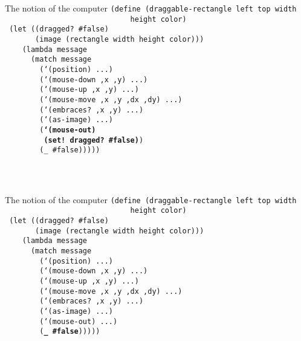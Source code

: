 \begin{frame}{The notion of the computer}
  \small
  \texttt{(define (draggable-rectangle left top width \\
    \ \ \ \ \ \ \ \ \ \ \ \ \ \ \ \ \ \ \ \ \ \ \ \ \ \ \ \ \ height color)\\
    \ (let ((dragged? \#false)\\
  \ \ \ \ \ \ \ (image (rectangle width height color)))\\
  \ \ \ \ (lambda message\\
  \ \ \ \ \ \ (match message\\
  \ \ \ \ \ \ \ \ (`(position) ...)\\
  \ \ \ \ \ \ \ \ (`(mouse-down ,x ,y) ...)\\
  \ \ \ \ \ \ \ \ (`(mouse-up ,x ,y) ...)\\
  \ \ \ \ \ \ \ \ (`(mouse-move ,x ,y ,dx ,dy) ...)\\
  \ \ \ \ \ \ \ \ (`(embraces? ,x ,y) ...)\\
  \ \ \ \ \ \ \ \ (`(as-image) ...)\\
  \ \ \ \ \ \ \ \ (\textbf{`(mouse-out) \\
  \ \ \ \ \ \ \ \ \ (set! dragged? \#false)})\\
  \ \ \ \ \ \ \ \ (\_ \#false)))))\\
  \ \\
  \ \\
  \ 
}
\end{frame}


\begin{frame}{The notion of the computer}
  \small
  \texttt{(define (draggable-rectangle left top width \\
    \ \ \ \ \ \ \ \ \ \ \ \ \ \ \ \ \ \ \ \ \ \ \ \ \ \ \ \ \ height color)\\
    \ (let ((dragged? \#false)\\
  \ \ \ \ \ \ \ (image (rectangle width height color)))\\
  \ \ \ \ (lambda message\\
  \ \ \ \ \ \ (match message\\
  \ \ \ \ \ \ \ \ (`(position) ...)\\
  \ \ \ \ \ \ \ \ (`(mouse-down ,x ,y) ...)\\
  \ \ \ \ \ \ \ \ (`(mouse-up ,x ,y) ...)\\
  \ \ \ \ \ \ \ \ (`(mouse-move ,x ,y ,dx ,dy) ...)\\
  \ \ \ \ \ \ \ \ (`(embraces? ,x ,y) ...)\\
  \ \ \ \ \ \ \ \ (`(as-image) ...)\\
  \ \ \ \ \ \ \ \ (`(mouse-out) ...)\\
  \ \ \ \ \ \ \ \ (\textbf{\_ \#false})))))\\
  \ \\
  \ \\
  \ \\
  \ 
}
\end{frame}

